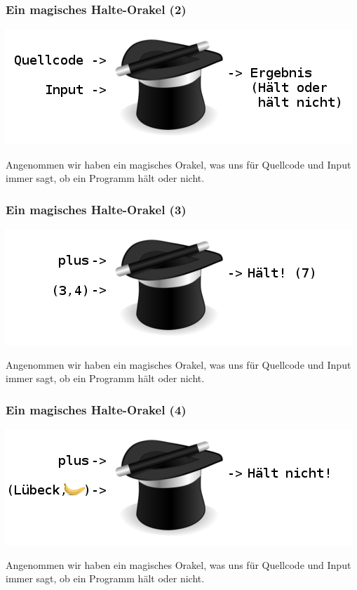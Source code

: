 \documentclass[aspectratio=43]{beamer}
\begin{document}

\begin{frame}
\frametitle{Ein magisches Halte-Orakel (2)}
\begin{center}
\includegraphics[scale=1.4]{images/erklaerung01.png} 
\bigskip

Angenommen wir haben ein magisches Orakel, was uns für Quellcode und Input immer sagt, ob ein Programm hält oder nicht.
\end{center}
\end{frame}


\begin{frame}
\frametitle{Ein magisches Halte-Orakel (3)}
\begin{center}
\includegraphics[scale=1.4]{images/erklaerung02.png} 
\bigskip

Angenommen wir haben ein magisches Orakel, was uns für Quellcode und Input immer sagt, ob ein Programm hält oder nicht.
\end{center}
\end{frame}


\begin{frame}
\frametitle{Ein magisches Halte-Orakel (4)}
\begin{center}
\includegraphics[scale=1.4]{images/erklaerung03.png}
\bigskip

Angenommen wir haben ein magisches Orakel, was uns für Quellcode und Input immer sagt, ob ein Programm hält oder nicht. 
\end{center}
\end{frame}
\end{document}

